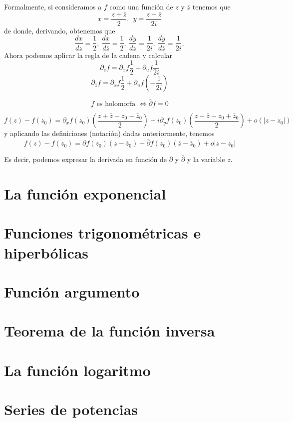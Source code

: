 \documentclass{apuntes}
\begin{document}
Formalmente, si consideramos a $f$ como una función de $z$ y $\bar{z}$ tenemos que
\[x = \frac{z+\bar{z}}{2}, \ \ y = \frac{z-\bar{z}}{2i}\]
de donde, derivando, obtenemos que
\[\frac{dx}{dz}=\frac{1}{2}, \ \frac{dx}{d\bar{z}}=\frac{1}{2}, \ \frac{dy}{dz}=\frac{1}{2i}, \ \frac{dy}{d\bar{z}}=\frac{1}{2i},\]
Ahora podemos aplicar la regla de la cadena y calcular
\[\partial_z f = \partial_x f \frac{1}{2}+\partial_u f \frac{1}{2i}\]
\[\partial_{\bar{z}} f = \partial_x f \frac{1}{2}+\partial_u f \left(-\frac{1}{2i}\right)\]

\begin{prop}
\[f\text{ es holomorfa } \iff \bar{\partial}f=0\]
\end{prop}

\begin{prop}
\[f(z)-f(z_0)=\partial_xf(z_0)\left(\frac{z+\bar{z}-z_0-\bar{z}_0}{2}\right)-i\partial_y f (z_0)\left( \frac{z-\bar{z}-z_0+\bar{z}_0}{2}\right) + o (|z-z_0|)\]
y aplicando las definiciones (notación) dadas anteriormente, tenemos
\[f(z)-f(z_0)= \partial f(z_0)(z-\bar{z}_0)+\bar{\partial}f(z_0)(\bar{z}-\bar{z}_0)+o|z-z_0|\]

Es decir, podemos expresar la derivada en función de $\partial$ y $\bar{\partial}$ y la variable $z$.
\end{prop}

\section{La función exponencial}
\section{Funciones trigonométricas e hiperbólicas}
\section{Función argumento}
\section{Teorema de la función inversa}
\section{La función logaritmo}
\section{Series de potencias}
\end{document}
